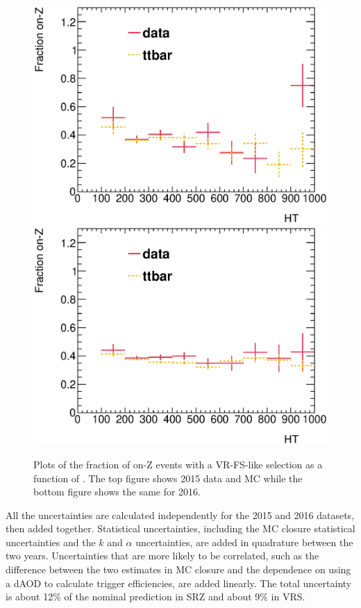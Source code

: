 \begin{centering}
\begin{figure}[!hbt]
\myfloatalign
\includegraphics[width=.85\linewidth]{figures/fs/frac_vs_ht_2015.eps}
\includegraphics[width=.85\linewidth]{figures/fs/frac_vs_ht_2016.eps}
\caption{Plots of the fraction of on-Z events with a VR-FS-like selection as a function of \HT. The top figure shows 2015 data and \ac{MC} while the bottom figure shows the same for 2016.}
\label{fig:fs_frac_ht}
\end{figure}
\end{centering}

All the uncertainties are calculated independently for the 2015 and 2016 datasets, then added together. Statistical uncertainties, including the \ac{MC} closure statistical uncertainties and the $k$ and $\alpha$ uncertainties, are added in quadrature between the two years. Uncertainties that are more likely to be correlated, such as the difference between the two estimates in \ac{MC} closure and the dependence on using a dAOD to calculate trigger efficiencies, are added linearly. The total uncertainty is about 12\% of the nominal prediction in SRZ and about 9\% in VRS. 

